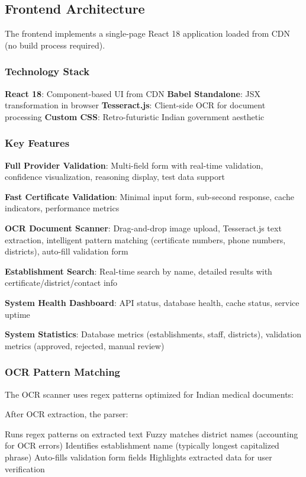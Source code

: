 \documentclass[conference]{IEEEtran}
\begin{document}
\subsection{Frontend Architecture}

The frontend implements a single-page React 18 application loaded from CDN (no build process required).

\subsubsection{Technology Stack}

\textbf{React 18}: Component-based UI from CDN
\textbf{Babel Standalone}: JSX transformation in browser
\textbf{Tesseract.js}: Client-side OCR for document processing
\textbf{Custom CSS}: Retro-futuristic Indian government aesthetic

\subsubsection{Key Features}

\textbf{Full Provider Validation}: Multi-field form with real-time validation, confidence visualization, reasoning display, test data support

\textbf{Fast Certificate Validation}: Minimal input form, sub-second response, cache indicators, performance metrics

\textbf{OCR Document Scanner}: Drag-and-drop image upload, Tesseract.js text extraction, intelligent pattern matching (certificate numbers, phone numbers, districts), auto-fill validation form

\textbf{Establishment Search}: Real-time search by name, detailed results with certificate/district/contact info

\textbf{System Health Dashboard}: API status, database health, cache status, service uptime

\textbf{System Statistics}: Database metrics (establishments, staff, districts), validation metrics (approved, rejected, manual review)

\subsubsection{OCR Pattern Matching}

The OCR scanner uses regex patterns optimized for Indian medical documents:

After OCR extraction, the parser:

Runs regex patterns on extracted text
Fuzzy matches district names (accounting for OCR errors)
Identifies establishment name (typically longest capitalized phrase)
Auto-fills validation form fields
Highlights extracted data for user verification
\end{document}
